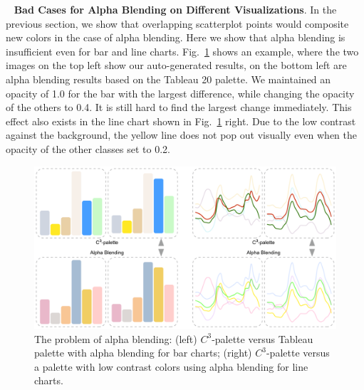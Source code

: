 \documentclass[review,onecolumn]{vgtc}                %
\newcommand{\myparagraph}[1]{\mbox{\ } \newline \noindent \textbf{#1}}
\renewcommand{\paragraph}[1]{\myparagraph{#1}}
\begin{document}
\paragraph{Bad Cases for Alpha Blending on Different Visualizations}.
In the previous section, we show that overlapping scatterplot points would composite new colors in the case of alpha blending. Here we show that alpha blending is insufficient even for bar and line charts. Fig.~\ref{fig:badcaseAB} shows an example, where the two images on the top left show our auto-generated results, on the bottom left are  alpha blending results based on the Tableau 20 palette. We maintained an opacity of 1.0 for the bar with the largest difference, while changing the opacity of the others to 0.4. It is still hard to find the largest change immediately. This effect also exists in the line chart shown in Fig.~\ref{fig:badcaseAB} right. Due to the low contrast against the background, the yellow line does not pop out visually even when the opacity of the other classes set to 0.2.

\begin{figure}[ht]
\centering
\includegraphics[width=0.96\linewidth]{badcaseAB.pdf}
\caption{The problem of alpha blending: (left) $C^3$-palette versus Tableau palette with alpha blending for bar charts; (right) $C^3$-palette versus a palette with low contrast colors using alpha blending for line charts.}
\vspace*{-5mm}
\label{fig:badcaseAB}
\end{figure}


\end{document}
